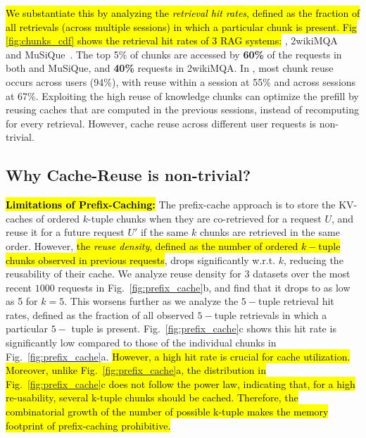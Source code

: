 \hl{We substantiate this by analyzing the \textit{retrieval hit rates}, defined as the fraction of all retrievals (across multiple sessions) in which a particular chunk is present. Fig \ref{fig:chunks_cdf} shows the retrieval hit rates of 3 RAG systems:} \X, 2wikiMQA~\cite{ho-etal-2020-constructing} and MuSiQue~\cite{10.1162/tacl_a_00475}. The top 5\% of chunks are accessed by \textbf{60\%} of the requests in both \X and MuSiQue, and \textbf{40\%} requests in 2wikiMQA. In \X, most chunk reuse occurs across users (94\%), with reuse within a session at 55\% and across sessions at 67\%.
%
Exploiting the high reuse of knowledge chunks can optimize the prefill by reusing caches that are computed in the previous sessions, instead of recomputing for every retrieval. 
However, cache reuse across different user requests is non-trivial. 



\subsection{Why Cache-Reuse is non-trivial?}
\label{sec:challenges}




\hl{\textbf{Limitations of Prefix-Caching:}} The prefix-cache approach is to store the KV-caches of ordered $k$-tuple chunks when they are co-retrieved for a request $U$, and reuse it for a future request $U'$ if the same $k$ chunks are retrieved in the same order. However, \hl{the \textit{reuse density}, defined as the number of ordered $k-$tuple chunks observed in previous requests}, drops significantly w.r.t. $k$, reducing the reusability of their cache. 
We analyze reuse density for 3 datasets over the most recent $1000$ requests in Fig.~\ref{fig:prefix_cache}b, and find that it drops 
to as low as 5 for $k=5$. 
This worsens further as we analyze the $5-$tuple retrieval hit rates, defined as the fraction of all observed $5-$tuple retrievals in which a particular $5-$ tuple is present. Fig.~\ref{fig:prefix_cache}c shows this hit rate is significantly low compared to those of the individual chunks in Fig.~\ref{fig:prefix_cache}a.
\hl{However, a high hit rate is crucial for cache utilization. Moreover, unlike Fig.~\ref{fig:prefix_cache}a, the distribution in Fig.~\ref{fig:prefix_cache}c does not follow the power law, indicating that, for a high re-usability, several k-tuple chunks should be cached. Therefore,
the combinatorial growth of the number of possible k-tuple makes the memory footprint of prefix-caching prohibitive.}





